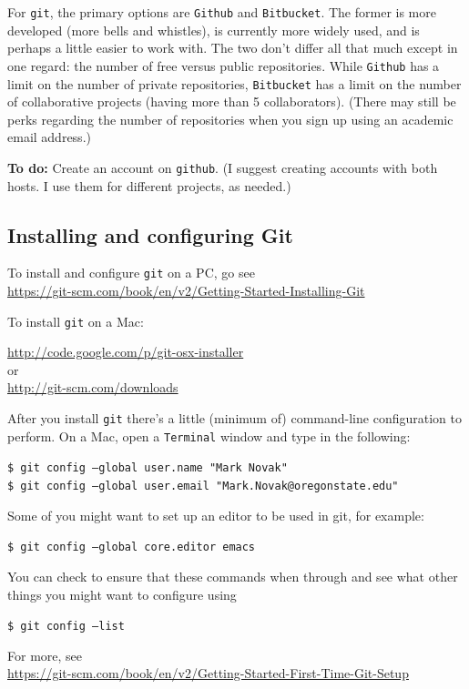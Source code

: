 \documentclass[12pt,letterpaper]{article}
\begin{document}
For \texttt{git}, the primary options are \texttt{Github} and \texttt{Bitbucket}.  The former is more developed (more bells and whistles), is currently more widely used, and is perhaps a little easier to work with.  The two don't differ all that much except in one regard:  the number of free versus public repositories.  While \texttt{Github} has a limit on the number of private repositories, \texttt{Bitbucket} has a limit on the number of collaborative projects (having more than 5 collaborators).  (There may still be perks regarding the number of repositories when you sign up using an academic email address.)

\textbf{To do:} Create an account on \texttt{github}.  (I suggest creating accounts with both hosts.  I use them for different projects, as needed.)


\subsection{Installing and configuring Git}
To install and configure \texttt{git} on a PC, go see \\
\url{https://git-scm.com/book/en/v2/Getting-Started-Installing-Git}

To install \texttt{git} on a Mac:

\url{http://code.google.com/p/git-osx-installer}\\
or\\
\url{http://git-scm.com/downloads}


After you install \texttt{git} there's a little (minimum of) command-line configuration to perform.  On a Mac, open a \texttt{Terminal} window and type in the following:

     \texttt{\$ git config --global user.name "Mark Novak"}\\
     \texttt{\$ git config --global user.email "Mark.Novak@oregonstate.edu"}
       
Some of you might want to set up an editor to be used in git, for example:

	\texttt{\$ git config --global core.editor emacs}

You can check to ensure that these commands when through and see what other things you might want to configure using

	\texttt{\$ git config --list}


For more, see\\
\url{https://git-scm.com/book/en/v2/Getting-Started-First-Time-Git-Setup}
\end{document}
